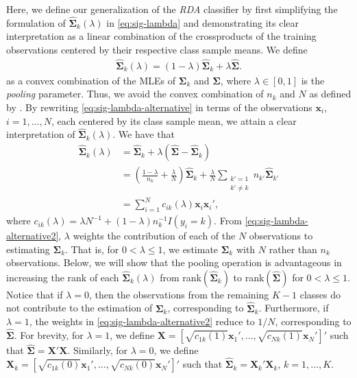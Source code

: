 \documentclass[11pt]{article}
\begin{document}
Here, we define our generalization of the \emph{RDA} classifier by first simplifying the formulation of $\widehat{\bm \Sigma}_k(\lambda)$ in \eqref{eq:sig-lambda} and demonstrating its clear interpretation as a linear combination of the crossproducts of the training observations centered by their respective class sample means. We define
\begin{align}
  \widehat{\bm\Sigma}_k(\lambda) = (1 - \lambda) \widehat{\bm\Sigma}_k + \lambda \widehat{\bm\Sigma}.\label{eq:sig-lambda-alternative}
\end{align}
as a convex combination of the MLEs of $\bm \Sigma_k$ and $\bm \Sigma$, where $\lambda \in [0, 1]$ is the \emph{pooling} parameter. Thus, we avoid the convex combination of $n_k$ and $N$ as defined by \cite{Friedman:1989tm}. By rewriting \eqref{eq:sig-lambda-alternative} in terms of the observations $\bm x_i$, $i = 1, \ldots, N$, each centered by its class sample mean, we attain a clear interpretation of $\widehat{\bm\Sigma}_k(\lambda)$. We have that
\begin{align}
	\widehat{\bm\Sigma}_k(\lambda) &= \widehat{\bm\Sigma}_k + \lambda (\widehat{\bm\Sigma} - \widehat{\bm\Sigma}_k) \nonumber\\
	&= \left( \frac{1 - \lambda}{n_k} + \frac{\lambda}{N} \right) \widehat{\bm\Sigma}_k +  \frac{\lambda}{N} \sum_{\substack{k' = 1\\k' \ne k}} n_{k'} \widehat{\bm\Sigma}_{k'} \nonumber \\
	&= \sum_{i=1}^N c_{ik}(\lambda) \bm x_i \bm x_i',\label{eq:sig-lambda-alternative2}
\end{align}
where $c_{ik}(\lambda) = \lambda N^{-1} + (1 - \lambda)n_k^{-1}I(y_i = k)$.
From \eqref{eq:sig-lambda-alternative2}, $\lambda$ weights the contribution of each of the $N$ observations to estimating $\bm \Sigma_k$. That is, for $0 < \lambda \le 1$, we estimate $\bm \Sigma_k$ with $N$ rather than $n_k$ observations. Below, we will show that the pooling operation is advantageous in increasing the rank of each $\widehat{\bm\Sigma}_k(\lambda)$ from rank$(\widehat{\bm\Sigma}_k)$ to rank$(\widehat{\bm\Sigma})$ for $0 < \lambda \le 1$. Notice that if $\lambda  = 0$, then the observations from the remaining $K - 1$ classes do not contribute to the estimation of $\bm \Sigma_k$, corresponding to $\widehat{\bm \Sigma}_k$. Furthermore, if $\lambda = 1$, the weights in \eqref{eq:sig-lambda-alternative2} reduce to $1/N$, corresponding to $\widehat{\bm\Sigma}$. For brevity, for $\lambda = 1$, we define $\bm X = [\sqrt{c_{1k}(1)} \bm x_1', \ldots,  \sqrt{c_{Nk}(1)} \bm x_N']'$ such that $\widehat{\bm \Sigma} = \bm X' \bm X$. Similarly, for $\lambda = 0$, we define $\bm X_k = [\sqrt{c_{1k}(0)} \bm x_1', \ldots,  \sqrt{c_{Nk}(0)} \bm x_N']'$ such that $\widehat{\bm \Sigma}_k = \bm X_k' \bm X_k$, $k = 1, \ldots, K$.
\end{document}
